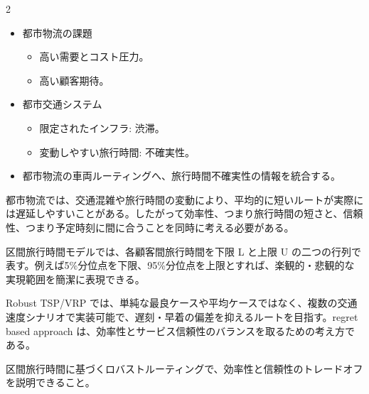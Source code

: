 \begin{multicols}{2}

\footnotesize

\raggedcolumns


\begin{itemize}
\item 都市物流の課題
\begin{itemize}
\item 高い需要とコスト圧力。
\item 高い顧客期待。
\end{itemize}
\item 都市交通システム
\begin{itemize}
\item 限定されたインフラ: 渋滞。
\item 変動しやすい旅行時間: 不確実性。
\end{itemize}
\item 都市物流の車両ルーティングへ、旅行時間不確実性の情報を統合する。
\end{itemize}

都市物流では、交通混雑や旅行時間の変動により、平均的に短いルートが実際には遅延しやすいことがある。したがって効率性、つまり旅行時間の短さと、信頼性、つまり予定時刻に間に合うことを同時に考える必要がある。\par

区間旅行時間モデルでは、各顧客間旅行時間を下限 L と上限 U の二つの行列で表す。例えば5\%分位点を下限、95\%分位点を上限とすれば、楽観的・悲観的な実現範囲を簡潔に表現できる。\par

Robust TSP/VRP では、単純な最良ケースや平均ケースではなく、複数の交通速度シナリオで実装可能で、遅刻・早着の偏差を抑えるルートを目指す。regret based approach は、効率性とサービス信頼性のバランスを取るための考え方である。\par

区間旅行時間に基づくロバストルーティングで、効率性と信頼性のトレードオフを説明できること。\par


\end{multicols}
